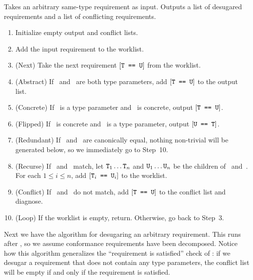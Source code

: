 \documentclass[../generics]{subfiles}
\begin{document}
\begin{algorithm}\label{desugar same type algo} Takes an arbitrary same-type requirement as input. Outputs a list of desugared requirements and a list of conflicting requirements.
\begin{enumerate}
\item Initialize empty output and conflict lists.
\item Add the input requirement to the worklist.
\item (Next) Take the next requirement $[\texttt{T == U}]$ from the worklist.
\item (Abstract) If \tT\ and \tU\ are both type parameters, add $[\texttt{T == U}]$ to the output list.
\item (Concrete) If \tT\ is a type parameter and \tU\ is concrete, output $[\texttt{T == U}]$.
\item (Flipped) If \tT\ is concrete and \tU\ is a type parameter, output $[\texttt{U == T}]$.
\item (Redundant) If \tT\ and \tU\ are canonically equal, nothing non-trivial will be generated below, so we immediately go to Step~10.
\item (Recurse) If \tT\ and \tU\ match, let $\texttt{T}_1\ldots\texttt{T}_n$ and $\texttt{U}_1\ldots\texttt{U}_n$ be the children of \tT\ and~\tU. For each $1\le i\le n$, add $[\texttt{$\texttt{T}_i$ == $\texttt{U}_i$}]$ to the worklist.
\item (Conflict) If \tT\ and \tU\ do not match, add $[\texttt{T == U}]$ to the conflict list and diagnose.
\item (Loop) If the worklist is empty, return. Otherwise, go back to Step~3.
\end{enumerate}
\end{algorithm}
Next we have the algorithm for desugaring an arbitrary requirement. This runs after , so we assume conformance requirements have been decomposed. Notice how this algorithm generalizes the ``requirement is satisfied'' check of : if we desugar a requirement that does not contain any type parameters, the conflict list will be empty if and only if the requirement is satisfied.
\end{document}
